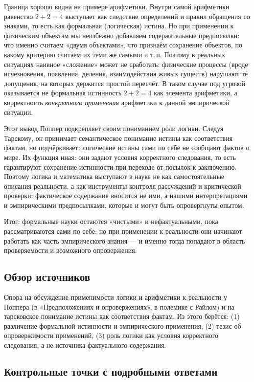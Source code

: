 \documentclass[a4paper,12pt]{article}
\begin{document}
Граница хорошо видна на примере арифметики. Внутри самой арифметики равенство $2+2=4$ выступает как следствие определений и правил обращения со знаками, то есть как формальная (логическая) истина. Но при применении к физическим объектам мы неизбежно добавляем содержательные предпосылки: что именно считаем «двумя объектами», что признаём сохранение объектов, по какому критерию считаем их теми же самыми и т.\,п. Поэтому в реальных ситуациях наивное «сложение» может не сработать: физические процессы (вроде исчезновения, появления, деления, взаимодействия живых существ) нарушают те допущения, на которых держится простой пересчёт. В таком случае под угрозой оказывается не формальная истинность $2+2=4$ как элемента арифметики, а корректность \textit{конкретного применения} арифметики к данной эмпирической ситуации.

Этот вывод Поппер подкрепляет своим пониманием роли логики. Следуя Тарскому, он принимает семантическое понимание истины как соответствия фактам, но подчёркивает: логические истины сами по себе не сообщают фактов о мире. Их функция иная: они задают условия корректного следования, то есть гарантируют сохранение истинности при переходе от посылок к заключению. Поэтому логика и математика выступают в науке не как самостоятельные описания реальности, а как инструменты контроля рассуждений и критической проверки: фактическое содержание вносится не ими, а нашими интерпретациями и эмпирическими предпосылками, которые и могут быть опровергнуты опытом.

Итог: формальные науки остаются «чистыми» и нефактуальными, пока рассматриваются сами по себе; но при применении к реальности они начинают работать как часть эмпирического знания — и именно тогда попадают в область проверяемости и возможного опровержения.

\subsection{Обзор источников}

Опора на обсуждение применимости логики и арифметики к реальности у Поппера (в «Предположениях и опровержениях», в полемике с Райлом) и на тарсковское понимание истины как соответствия фактам. Из этого берётся: (1) различение формальной истинности и эмпирического применения, (2) тезис об опровержимости применений, (3) роль логики как условия корректного следования, а не источника фактуального содержания.

\subsection{Контрольные точки с подробными ответами}
\end{document}
